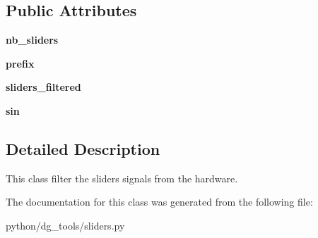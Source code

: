 \subsection*{Public Attributes}
\begin{DoxyCompactItemize}
\item 
{\bfseries nb\+\_\+sliders}\hypertarget{classpython_1_1dg__tools_1_1sliders_1_1Sliders_aa6e35d118cbd65496ed693771aa41a73}{}\label{classpython_1_1dg__tools_1_1sliders_1_1Sliders_aa6e35d118cbd65496ed693771aa41a73}

\item 
{\bfseries prefix}\hypertarget{classpython_1_1dg__tools_1_1sliders_1_1Sliders_a2b28e317b215914cc78c4ae12d01cd93}{}\label{classpython_1_1dg__tools_1_1sliders_1_1Sliders_a2b28e317b215914cc78c4ae12d01cd93}

\item 
{\bfseries sliders\+\_\+filtered}\hypertarget{classpython_1_1dg__tools_1_1sliders_1_1Sliders_a85047ac2a88c1da44dc1df05434ecb63}{}\label{classpython_1_1dg__tools_1_1sliders_1_1Sliders_a85047ac2a88c1da44dc1df05434ecb63}

\item 
{\bfseries sin}\hypertarget{classpython_1_1dg__tools_1_1sliders_1_1Sliders_a4ecb50f7c4cf17aef714880d516db213}{}\label{classpython_1_1dg__tools_1_1sliders_1_1Sliders_a4ecb50f7c4cf17aef714880d516db213}

\end{DoxyCompactItemize}


\subsection{Detailed Description}
This class filter the sliders signals from the hardware. 

The documentation for this class was generated from the following file\+:\begin{DoxyCompactItemize}
\item 
python/dg\+\_\+tools/sliders.\+py\end{DoxyCompactItemize}
